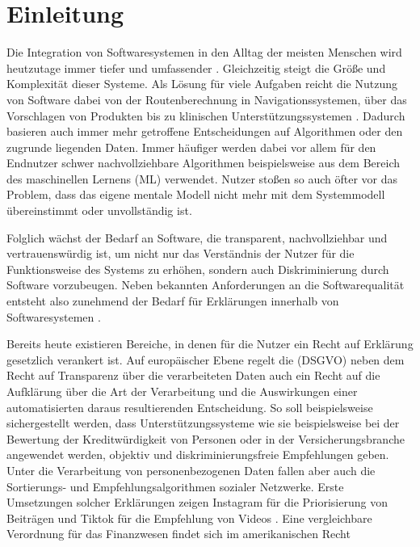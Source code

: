\chapter{Einleitung}

Die Integration von Softwaresystemen in den Alltag der meisten Menschen wird heutzutage immer tiefer und umfassender \cite{carvalho2020developers}.  Gleichzeitig steigt die Größe und Komplexität dieser Systeme. Als Lösung für viele Aufgaben reicht die Nutzung von Software dabei von der Routenberechnung in Navigationssystemen, über das Vorschlagen von Produkten bis zu klinischen Unterstützungssystemen \cite{chazette2020explainability, tintarev2015explaining, cypko2017guide}. Dadurch basieren auch immer mehr getroffene Entscheidungen auf Algorithmen oder den zugrunde liegenden Daten. Immer häufiger werden dabei vor allem für den Endnutzer schwer nachvollziehbare Algorithmen beispielsweise aus dem Bereich des maschinellen Lernens (ML) verwendet. Nutzer stoßen so auch öfter vor das Problem, dass das eigene mentale Modell nicht mehr mit dem Systemmodell übereinstimmt oder unvollständig ist.

Folglich wächst der Bedarf an Software, die transparent, nachvollziehbar und vertrauenswürdig ist, um nicht nur das Verständnis der Nutzer für die Funktionsweise des Systems zu erhöhen, sondern auch Diskriminierung durch Software vorzubeugen. Neben bekannten Anforderungen an die Softwarequalität \cite{international2011iso} entsteht also zunehmend der Bedarf für Erklärungen innerhalb von Softwaresystemen \cite{chazette_end-users_nodate}.

Bereits heute existieren Bereiche, in denen für die Nutzer ein \glqq Recht auf Erklärung\grqq{} gesetzlich verankert ist. Auf europäischer Ebene regelt die  (DSGVO) \cite{eu_verordnung_2016} neben dem Recht auf Transparenz über die verarbeiteten Daten auch ein Recht auf die Aufklärung über die Art der Verarbeitung und die Auswirkungen einer automatisierten daraus resultierenden Entscheidung. So soll beispielsweise sichergestellt werden, dass Unterstützungssysteme wie sie beispielsweise bei der Bewertung der Kreditwürdigkeit von Personen oder in der Versicherungsbranche angewendet werden, objektiv und diskriminierungsfreie Empfehlungen geben. Unter die Verarbeitung von personenbezogenen Daten fallen aber auch die Sortierungs- und Empfehlungsalgorithmen sozialer Netzwerke. Erste Umsetzungen solcher Erklärungen zeigen Instagram für die Priorisierung von Beiträgen und Tiktok für die Empfehlung von Videos \cite{mosseri_shedding_2021,tiktok_technology_limited_how_2021}. Eine vergleichbare Verordnung für das Finanzwesen findet sich im amerikanischen Recht \cite{cfpb_regulation_2018}

